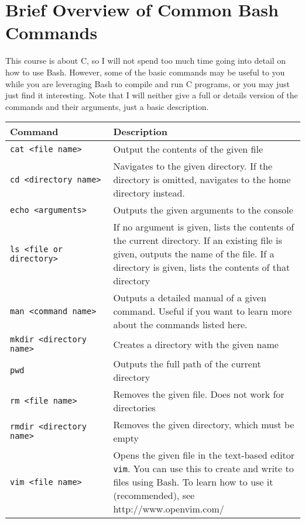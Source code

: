 \documentclass{article}
\begin{document}
\section*{Brief Overview of Common Bash Commands}
This course is about C, so I will not spend too much time going into detail on how to use Bash. However, some of the
basic commands may be useful to you while you are leveraging Bash to compile and run C programs, or you may just
just find it interesting. Note that I will neither give a full or details version of the commands and their arguments,
just a basic description. \\
\begin{tabular}{|p{0.35\linewidth}|p{0.65\linewidth}|}
\hline
\textbf{Command} & \textbf{Description} \\\hline
\verb|cat <file name>| & Output the contents of the given file \\\hline
\verb|cd <directory name>| & Navigates to the given directory. If the directory is omitted, 
navigates to the home directory instead.\\\hline
\verb|echo <arguments>| & Outputs the given arguments to the console \\\hline
\verb|ls <file or directory>| & If no argument is given, lists the contents of the current directory.
If an existing file is given, outputs the name of the file. If a directory is given, lists the contents of that 
directory \\\hline
\verb|man <command name>| & Outputs a detailed manual of a given command. Useful if you want to learn more about
the commands listed here. \\\hline
\verb|mkdir <directory name>| & Creates a directory with the given name \\\hline
\verb|pwd| & Outputs the full path of the current directory \\\hline
\verb|rm <file name>| & Removes the given file. Does not work for directories \\\hline
\verb|rmdir <directory name>| & Removes the given directory, which must be empty \\\hline
\verb|vim <file name>| & Opens the given file in the text-based editor \verb|vim|. You can use this to create and write
to files using Bash. To learn how to use it (recommended), see http://www.openvim.com/ \\\hline
\end{tabular}
\end{document}
